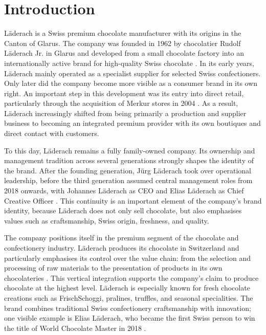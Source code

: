\section{Introduction}
\label{sec:intro}

Läderach is a Swiss premium chocolate manufacturer with its origins in the Canton
of Glarus. The company was founded in 1962 by chocolatier Rudolf Läderach Jr. in
Glarus and developed from a small chocolate factory into an internationally active
brand for high-quality Swiss chocolate \cite{laderachMilestones}. In its early
years, Läderach mainly operated as a specialist supplier for selected Swiss
confectioners. Only later did the company become more visible as a consumer brand
in its own right. An important step in this development was its entry into direct
retail, particularly through the acquisition of Merkur stores in 2004
\cite{laderachMilestones}. As a result, Läderach increasingly shifted from being
primarily a production and supplier business to becoming an integrated premium
provider with its own boutiques and direct contact with customers.

To this day, Läderach remains a fully family-owned company. Its ownership and
management tradition across several generations strongly shapes the identity of
the brand. After the founding generation, Jürg Läderach took over operational
leadership, before the third generation assumed central management roles from
2018 onwards, with Johannes Läderach as CEO and Elias Läderach as Chief Creative
Officer \cite{laderachLeadershipNextGeneration,laderachMilestones}. This
continuity is an important element of the company’s brand identity, because
Läderach does not only sell chocolate, but also emphasises values such as
craftsmanship, Swiss origin, freshness, and quality.

The company positions itself in the premium segment of the chocolate and
confectionery industry. Läderach produces its chocolate in Switzerland and
particularly emphasises its control over the value chain: from the selection and
processing of raw materials to the presentation of products in its own
chocolateries \cite{laderachOfficialWebsite,laderachOurBusinessUnits}. This
vertical integration supports the company’s claim to produce chocolate at the
highest level. Läderach is especially known for fresh chocolate creations such as
FrischSchoggi, pralines, truffles, and seasonal specialities. The brand combines
traditional Swiss confectionery craftsmanship with innovation; one visible
example is Elias Läderach, who became the first Swiss person to win the title of
World Chocolate Master in 2018 \cite{laderachMilestones}.

